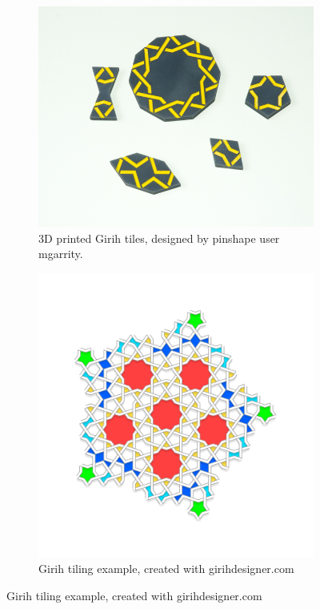 \documentclass[12pt,letterpaper]{article}
\begin{document}
\begin{figure}[H]
    \begin{center}
        \label{fig:girih}
        \caption{Girih base tiles and tessellation}
        \begin{subfigure}[b]{.5\linewidth}
            \includegraphics[width=\linewidth]{3dgirih}
            \caption{3D printed Girih tiles, designed by pinshape user mgarrity.}
            \label{fig:3dgirih}
        \end{subfigure}
        \begin{subfigure}[b]{.4\linewidth}
            \includegraphics[width=\linewidth]{girih-art}
            \caption{Girih tiling example, created with girihdesigner.com}
            \label{fig:girihex}
        \end{subfigure}
    \end{center}
\end{figure}
\end{document}
